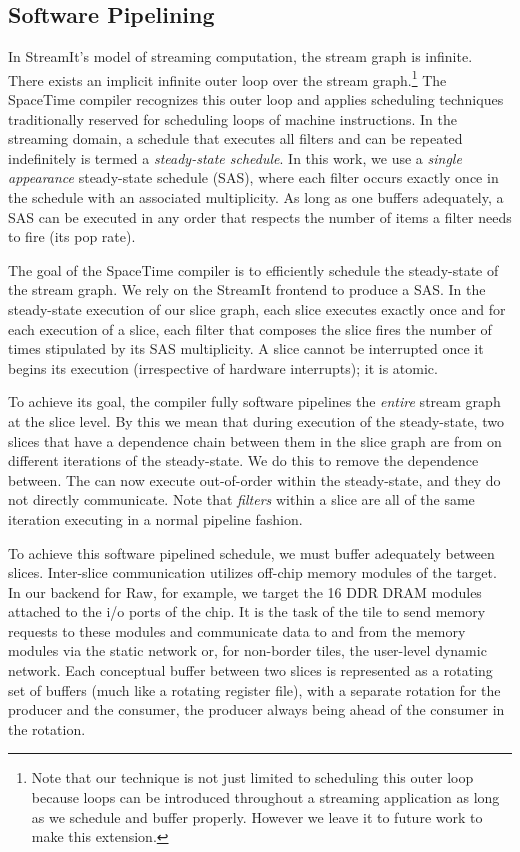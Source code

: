 \subsection{Software Pipelining}
\label{sec:softpipe}
In StreamIt's model of streaming computation, the stream graph is
infinite.  There exists an implicit infinite outer loop over the
stream graph.\footnote{Note that our technique is not just limited to
scheduling this outer loop because loops can be introduced throughout
a streaming application as long as we schedule and buffer properly.
However we leave it to future work to make this extension.}  The
SpaceTime compiler recognizes this outer loop and applies scheduling
techniques traditionally reserved for scheduling loops of machine
instructions.  In the streaming domain, a schedule that executes all
filters and can be repeated indefinitely is termed a {\it steady-state
schedule}.  In this work, we use a {\it single appearance}
steady-state schedule (SAS), where each filter occurs exactly once in
the schedule with an associated multiplicity.  As long as one buffers
adequately, a SAS can be executed in any order that respects the
number of items a filter needs to fire (its pop rate).

The goal of the SpaceTime compiler is to efficiently schedule the
steady-state of the stream graph.  We rely on the StreamIt frontend to
produce a SAS.  In the steady-state execution of our slice graph, each
slice executes exactly once and for each execution of a slice, each
filter that composes the slice fires the number of times stipulated by
its SAS multiplicity.  A slice cannot be interrupted once it begins
its execution (irrespective of hardware interrupts); it is atomic.

To achieve its goal, the compiler fully software pipelines the {\it
entire} stream graph at the slice level. By this we mean that during
execution of the steady-state, two slices that have a dependence chain
between them in the slice graph are from on different iterations of
the steady-state.  We do this to remove the dependence between.  The
can now execute out-of-order within the steady-state, and they do not
directly communicate.  Note that {\it filters} within a slice are all of the
same iteration executing in a normal pipeline fashion.

To achieve this software pipelined schedule, we must buffer adequately
between slices.  Inter-slice communication utilizes off-chip memory
modules of the target.  In our backend for Raw, for example, we target
the 16 DDR DRAM modules attached to the i/o ports of the chip.  It is
the task of the tile to send memory requests to these modules and
communicate data to and from the memory modules via the static network
or, for non-border tiles, the user-level dynamic network.  Each
conceptual buffer between two slices is represented as a rotating set
of buffers (much like a rotating register file), with a separate
rotation for the producer and the consumer, the producer
always being ahead of the consumer in the rotation.

